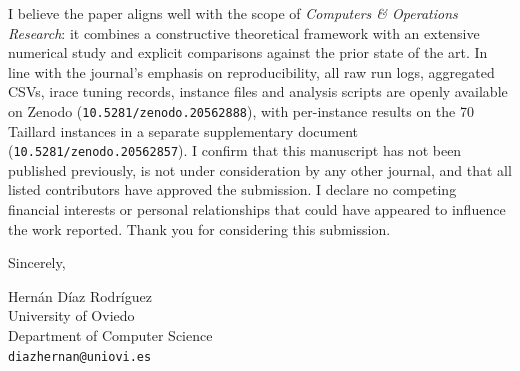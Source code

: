\documentclass[11pt,a4paper]{article}
\begin{document}
I believe the paper aligns well with the scope of \emph{Computers \& Operations
Research}: it combines a constructive theoretical framework with an extensive
numerical study and explicit comparisons against the prior state of the art.
In line with the journal's emphasis on reproducibility, all raw run logs,
aggregated CSVs, irace tuning records, instance files and analysis scripts are
openly available on Zenodo (\texttt{10.5281/zenodo.20562888}), with per-instance
results on the 70 Taillard instances in a separate supplementary document
(\texttt{10.5281/zenodo.20562857}). I confirm that this manuscript has not been
published previously, is not under consideration by any other journal, and
that all listed contributors have approved the submission. I declare no
competing financial interests or personal relationships that could have
appeared to influence the work reported. Thank you for considering this
submission.

\bigskip

\noindent Sincerely,

\medskip

\noindent
Hern\'an D\'iaz Rodr\'iguez\\
University of Oviedo\\
Department of Computer Science\\
\texttt{diazhernan@uniovi.es}
\end{document}

